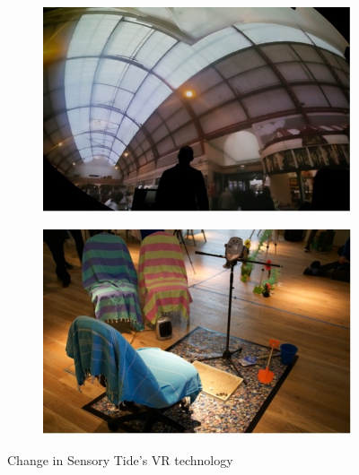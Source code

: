 \begin{figure}
\centering
\begin{subfigure}{.5\textwidth}
  \centering
  \includegraphics[width=.8\linewidth]{Images/DemVR/Findings/DomeProjection.jpg}
  \label{fig:Dome}
\end{subfigure}%
\begin{subfigure}{.5\textwidth}
  \centering
  \includegraphics[width=.8\linewidth]{Images/DemVR/Findings/SensoryTideDIY.jpg}
  \label{fig:senosryTideDIY}
\end{subfigure}
\caption{Change in Sensory Tide's VR technology}
\label{fig:SensoryTideDesignProcess}
\end{figure}

